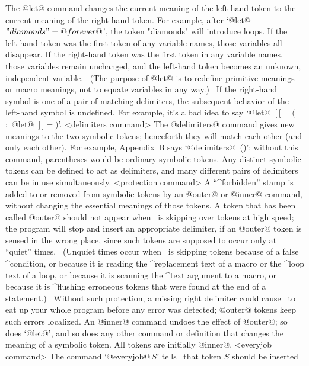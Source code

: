\endsyntax
The @let@ command changes the current meaning of the left-hand token
to the current meaning of the right-hand token. For example,
after `@let@ $"diamonds"=@forever@$', the token "diamonds" will
introduce loops. If the left-hand token was the first token of
any variable names, those variables all disappear. If the right-hand
token was the first token in any variable names, those variables
remain unchanged, and the left-hand token becomes
an unknown, independent variable. \ (The purpose of @let@ is to redefine
primitive meanings or macro meanings, not to equate variables in any way.)
\ If the right-hand symbol is one of a pair of matching delimiters,
the subsequent behavior of the left-hand symbol is undefined.
For example, it's a bad idea to say `@let@~$[\,[=($;~@let@~$]\,]=)$'.
\beginsyntax
<delimiters command>
\endsyntax
The @delimiters@ command gives new meanings to the two symbolic tokens;
henceforth they will match each other (and only each other). For example,
Appendix~B says `@delimiters@~()'; without this command, parentheses
would be ordinary symbolic tokens. Any distinct symbolic tokens can be
defined to act as delimiters, and many different pairs of delimiters
can be in use simultaneously.
\beginsyntax
<protection command>
\endsyntax
A ``^{forbidden}'' stamp is added to or removed from symbolic tokens
by an @outer@ or @inner@ command, without changing the essential meanings
of those tokens. A token that has been called @outer@ should not appear
when \MF\ is skipping over tokens at high speed; the program will stop
and insert an appropriate delimiter, if an @outer@ token is sensed in
the wrong place, since such tokens are supposed to occur only at
``quiet'' times. \ (Unquiet times occur when \MF\ is skipping tokens
because of a false ^{condition}, or because it is reading the ^{replacement
text} of a macro or the ^{loop text} of a loop, or because it is scanning
the ^{text argument} to a macro, or because it is ^{flushing} erroneous
tokens that were found at the end of a statement.) \ Without such
protection, a missing right delimiter could cause \MF\ to eat up your
whole program before any error was detected; @outer@ tokens keep such
errors localized.  An @inner@ command undoes the effect of @outer@; so
does `@let@', and so does any other command or definition that changes the
meaning of a symbolic token.  All tokens are initially @inner@.
\beginsyntax
<everyjob command>
\endsyntax
The command `@everyjob@$\,S$' tells \MF\ that token $S$ should be inserted
